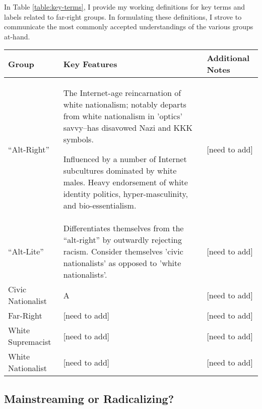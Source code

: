 \documentclass[acmlarge, screen, authorversion]{acmart}
\begin{document}
In Table \ref{table:key-terms}, I provide my working definitions for key terms and labels related to far-right groups. In formulating these definitions, I strove to communicate the most commonly accepted understandings of the various groups at-hand.

\begin{table*}
\caption{Key Far-Right Groups and Terms}
\label{table:key-terms}
\begin{tabular}{ p{2cm}  p{6cm}  p{4cm} }

  \toprule
  Group & Key Features & Additional Notes \\
  \midrule
  ``Alt-Right'' & The Internet-age reincarnation of white nationalism; notably departs from white nationalism in 'optics' savvy--has disavowed Nazi and KKK symbols.

  Influenced by a number of Internet subcultures dominated by white males. Heavy endorsement of white identity politics, hyper-masculinity, and bio-essentialism.  & [need to add] \\
  \hline
  ``Alt-Lite''      & Differentiates themselves from the ``alt-right'' by outwardly rejecting racism. Consider themselves 'civic nationalists' as opposed to 'white nationalists'. & [need to add]    \\
  \hline
  Civic Nationalist & A                                                                                                                                                            & [need to add]    \\
  \hline
  Far-Right         & [need to add]                                                                                                                                                & [need to add]    \\
  \hline
  White Supremacist & [need to add]                                                                                                                                                & [need to add]    \\
  \hline
  White Nationalist & [need to add]                                                                                                                                                & [need to add]    \\
  \bottomrule
\end{tabular}
\end{table*}

\subsection{Mainstreaming or Radicalizing?}
\end{document}
